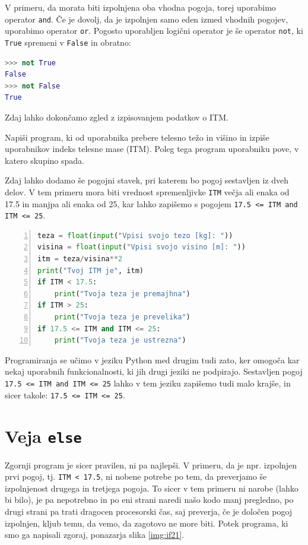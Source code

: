 V primeru, da morata biti izpolnjena oba vhodna pogoja, torej uporabimo operator \texttt{and}. Če je dovolj, da je izpolnjen samo eden izmed vhodnih pogojev, uporabimo operator \texttt{or}. Pogosto uporabljen logični operator je še operator \texttt{not}, ki \texttt{True} spremeni v \texttt{False} in obratno:
\begin{lstlisting}[language=Python]
>>> not True
False
>>> not False
True
\end{lstlisting}

Zdaj lahko dokončamo zgled z izpisovanjem podatkov o ITM.
\begin{zgled}
Napiši program, ki od uporabnika prebere telesno težo in višino in izpiše uporabnikov indeks telesne mase (ITM). Poleg tega program uporabniku pove, v katero skupino spada. 
\end{zgled}
\begin{resitev}
Zdaj lahko dodamo še pogojni stavek, pri katerem bo pogoj sestavljen iz dveh delov. V tem primeru mora biti vrednost spremenljivke \texttt{ITM} večja ali enaka od 17.5 in manjpa ali enaka od 25, kar lahko zapišemo s pogojem \texttt{17.5 <= ITM and ITM <= 25}.
\begin{lstlisting}[language=Python,numbers=left]
teza = float(input("Vpisi svojo tezo [kg]: "))
visina = float(input("Vpisi svojo visino [m]: "))
itm = teza/visina**2
print("Tvoj ITM je", itm)
if ITM < 17.5:
    print("Tvoja teza je premajhna")
if ITM > 25:
    print("Tvoja teza je prevelika")
if 17.5 <= ITM and ITM <= 25:
    print("Tvoja teza je ustrezna")
\end{lstlisting}
\end{resitev}

Programiranja se učimo v jeziku Python med drugim tudi zato, ker omogoča kar nekaj uporabnih funkcionalnosti, ki jih drugi jeziki ne podpirajo. Sestavljen pogoj \texttt{17.5 <= ITM and ITM <= 25} lahko v tem jeziku zapišemo tudi malo krajše, in sicer takole: \texttt{17.5 <= ITM <= 25}.

\section{Veja \texttt{else}}

Zgornji program je sicer pravilen, ni pa najlepši. V primeru, da je npr. izpolnjen prvi pogoj, tj. \texttt{ITM < 17.5}, ni nobene potrebe po tem, da preverjamo še izpolnjenost drugega in tretjega pogoja. To sicer v tem primeru ni narobe (lahko bi bilo), je pa nepotrebno in po eni strani naredi našo kodo manj pregledno, po drugi strani pa trati dragocen procesorski čas, saj preverja, če je določen pogoj izpolnjen, kljub temu, da vemo, da zagotovo ne more biti. Potek programa, ki smo ga napisali zgoraj, ponazarja slika \ref{img:if21}.

